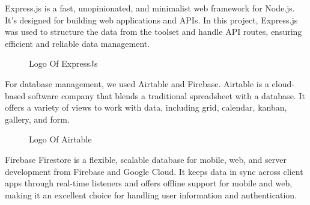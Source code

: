 Express.js is a fast, unopinionated, and minimalist web framework for Node.js. It's designed for building web applications and APIs. In this project, Express.js was used to structure the data from the  toolset and handle API routes, ensuring efficient and reliable data management.

\begin{figure}[H]
    \centering
    \caption{  Logo Of ExpressJs }
    \label{fig: ExpressJS_Logo}
\end{figure}

For database management, we used  {\color{purple}Airtable} and  {\color{purple}Firebase}. Airtable is a cloud-based software company that blends a traditional spreadsheet with a database. It offers a variety of views to work with data, including grid, calendar, kanban, gallery, and form. 

\begin{figure}[H]
    \centering
    \caption{  Logo Of Airtable }
    \label{fig: Airtable_Logo}
\end{figure}

\newpage
Firebase Firestore is a flexible, scalable database for mobile, web, and server development from Firebase and Google Cloud. It keeps data in sync across client apps through real-time listeners and offers offline support for mobile and web, making it an excellent choice for handling user information and authentication.

